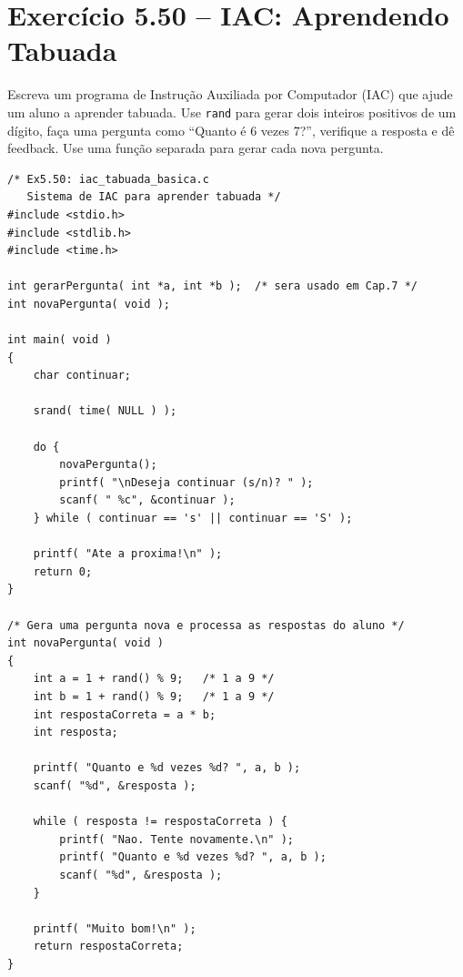 \documentclass[12pt,a4paper]{article}
\begin{document}
\newpage

\section{Exercício 5.50 -- IAC: Aprendendo Tabuada}

\begin{enunciadoBox}[Enunciado 5.50]
Escreva um programa de Instrução Auxiliada por Computador (IAC) que ajude um aluno
a aprender tabuada. Use \texttt{rand} para gerar dois inteiros positivos de um dígito,
faça uma pergunta como ``Quanto é 6 vezes 7?'', verifique a resposta e dê feedback.
Use uma função separada para gerar cada nova pergunta.
\end{enunciadoBox}

\begin{respostabox}
\begin{lstlisting}
/* Ex5.50: iac_tabuada_basica.c
   Sistema de IAC para aprender tabuada */
#include <stdio.h>
#include <stdlib.h>
#include <time.h>

int gerarPergunta( int *a, int *b );  /* sera usado em Cap.7 */
int novaPergunta( void );

int main( void )
{
    char continuar;

    srand( time( NULL ) );

    do {
        novaPergunta();
        printf( "\nDeseja continuar (s/n)? " );
        scanf( " %c", &continuar );
    } while ( continuar == 's' || continuar == 'S' );

    printf( "Ate a proxima!\n" );
    return 0;
}

/* Gera uma pergunta nova e processa as respostas do aluno */
int novaPergunta( void )
{
    int a = 1 + rand() % 9;   /* 1 a 9 */
    int b = 1 + rand() % 9;   /* 1 a 9 */
    int respostaCorreta = a * b;
    int resposta;

    printf( "Quanto e %d vezes %d? ", a, b );
    scanf( "%d", &resposta );

    while ( resposta != respostaCorreta ) {
        printf( "Nao. Tente novamente.\n" );
        printf( "Quanto e %d vezes %d? ", a, b );
        scanf( "%d", &resposta );
    }

    printf( "Muito bom!\n" );
    return respostaCorreta;
}
\end{lstlisting}
\end{respostabox}
\end{document}
